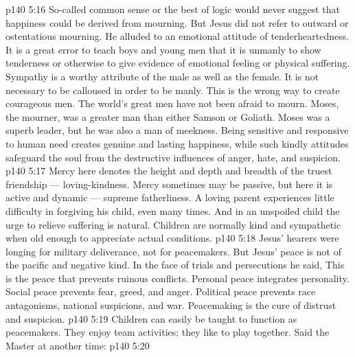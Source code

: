 \vs p140 5:16 \bibnobreakspace {} So\hyp{}called common sense or the best of logic would never suggest that happiness could be derived from mourning. But Jesus did not refer to outward or ostentatious mourning. He alluded to an emotional attitude of tenderheartedness. It is a great error to teach boys and young men that it is unmanly to show tenderness or otherwise to give evidence of emotional feeling or physical suffering. Sympathy is a worthy attribute of the male as well as the female. It is not necessary to be calloused in order to be manly. This is the wrong way to create courageous men. The world’s great men have not been afraid to mourn. Moses, the mourner, was a greater man than either Samson or Goliath. Moses was a superb leader, but he was also a man of meekness. Being sensitive and responsive to human need creates genuine and lasting happiness, while such kindly attitudes safeguard the soul from the destructive influences of anger, hate, and suspicion.
\vs p140 5:17 \bibnobreakspace {} Mercy here denotes the height and depth and breadth of the truest friendship --- loving\hyp{}kindness. Mercy sometimes may be passive, but here it is active and dynamic --- supreme fatherliness. A loving parent experiences little difficulty in forgiving his child, even many times. And in an unspoiled child the urge to relieve suffering is natural. Children are normally kind and sympathetic when old enough to appreciate actual conditions.
\vs p140 5:18 \bibnobreakspace {} Jesus’ hearers were longing for military deliverance, not for peacemakers. But Jesus’ peace is not of the pacific and negative kind. In the face of trials and persecutions he said,  This is the peace that prevents ruinous conflicts. Personal peace integrates personality. Social peace prevents fear, greed, and anger. Political peace prevents race antagonisms, national suspicions, and war. Peacemaking is the cure of distrust and suspicion.
\vs p140 5:19 Children can easily be taught to function as peacemakers. They enjoy team activities; they like to play together. Said the Master at another time: 
\vs p140 5:20 \bibnobreakspace {}
